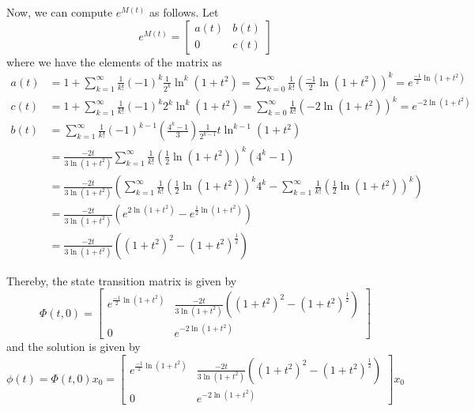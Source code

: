 Now, we can compute \( e^{M(t)} \) as follows.
Let
\begin{equation*}
    e^{M(t)}
      =
    \begin{bmatrix}
        a(t) & b(t) \\
        0    & c(t)
    \end{bmatrix}
\end{equation*}
where we have the elements of the matrix as
\begin{align*}
    a(t)
    & =
    1 + \sum_{k=1}^{\infty} \frac{1}{k!} {(-1)}^{k} \frac{1}{2^k} \ln^{k}(1+t^2)
    =
    \sum_{k=0}^{\infty} \frac{1}{k!} {\left( \frac{-1}{2} \ln(1+t^2) \right)}^{k}
    =
    e^{\frac{-1}{2} \ln(1+t^2)}
    \\
    c(t)
    & =
    1 + \sum_{k=1}^{\infty} \frac{1}{k!} {(-1)}^{k} 2^{k} \ln^{k}(1+t^2)
    =
    \sum_{k=0}^{\infty} \frac{1}{k!} {(-2 \ln(1+t^2))}^{k}
    =
    e^{-2 \ln(1+t^2)}
    \\
    b(t)
    & =
    \sum_{k=1}^{\infty} \frac{1}{k!} {(-1)}^{k-1} \left( \frac{4^k-1}{3} \right) \frac{1}{2^{k-1}} t \ln^{k-1}(1+t^2)
    \\ & =
    \frac{-2t}{3\ln(1+t^2)} \sum_{k=1}^{\infty} \frac{1}{k!} {\left( \frac{1}{2} \ln(1+t^2) \right)}^{k} (4^k - 1)
    \\ & =
    \frac{-2t}{3\ln(1+t^2)} \left(
        \sum_{k=1}^{\infty} \frac{1}{k!} {\left( \frac{1}{2} \ln(1+t^2) \right)}^{k} 4^k
        -
        \sum_{k=1}^{\infty} \frac{1}{k!} {\left( \frac{1}{2} \ln(1+t^2) \right)}^{k}
     \right)
     \\ & =
    \frac{-2t}{3\ln(1+t^2)} \left(
        e^{2 \ln(1+t^2)}
        -
        e^{\frac{1}{2} \ln(1+t^2)}
     \right)
     \\ & =
    \frac{-2t}{3\ln(1+t^2)} \left(
        {(1+t^2)}^{2}
        -
        {(1+t^2)}^{\frac{1}{2}}
     \right)
\end{align*}

Thereby, the state transition matrix is given by
\begin{equation*}
    \Phi(t, 0)
    =
    \begin{bmatrix}
        e^{\frac{-1}{2} \ln(1+t^2)}
        &
        \frac{-2t}{3\ln(1+t^2)} \left( {(1+t^2)}^{2} - {(1+t^2)}^{\frac{1}{2}} \right)
        \\
        0
        &
        e^{-2 \ln(1+t^2)}
    \end{bmatrix}
\end{equation*}
and the solution is given by
\begin{equation*}
    \phi(t)
    =
    \Phi(t, 0) x_0
    =
    \boxed{
    \begin{bmatrix}
        e^{\frac{-1}{2} \ln(1+t^2)}
        &
        \frac{-2t}{3\ln(1+t^2)} \left( {(1+t^2)}^{2} - {(1+t^2)}^{\frac{1}{2}} \right)
        \\
        0
        &
        e^{-2 \ln(1+t^2)}
    \end{bmatrix}
    x_0
    }
\end{equation*}
